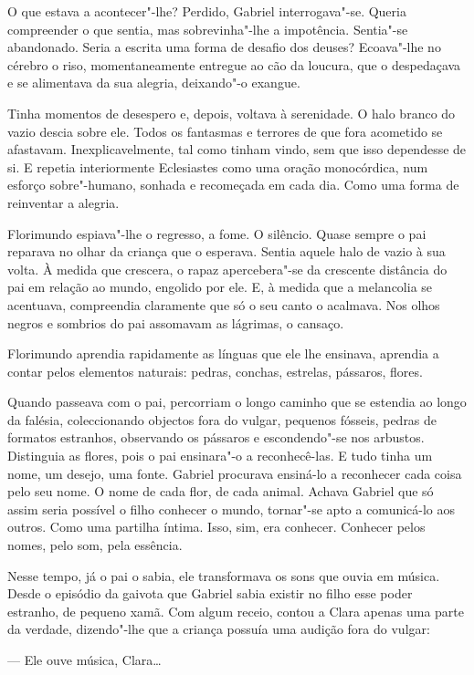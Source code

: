 O que estava a acontecer"-lhe? Perdido, Gabriel interrogava"-se. Queria
compreender o que sentia, mas sobrevinha"-lhe a impotência. Sentia"-se
abandonado. Seria a escrita uma forma de desafio dos deuses? Ecoava"-lhe
no cérebro o riso, momentaneamente entregue ao cão da loucura, que o
despedaçava e se alimentava da sua alegria, deixando"-o exangue.

Tinha momentos de desespero e, depois, voltava à serenidade. O halo
branco do vazio descia sobre ele. Todos os fantasmas e terrores de que
fora acometido se afastavam. Inexplicavelmente, tal como tinham vindo,
sem que isso dependesse de si. E repetia interiormente Eclesiastes como
uma oração monocórdica, num esforço sobre"-humano, sonhada e recomeçada
em cada dia. Como uma forma de reinventar a alegria.

Florimundo espiava"-lhe o regresso, a fome. O silêncio. Quase sempre o
pai reparava no olhar da criança que o esperava. Sentia aquele halo de
vazio à sua volta. À medida que crescera, o rapaz apercebera"-se da
crescente distância do pai em relação ao mundo, engolido por ele. E, à
medida que a melancolia se acentuava, compreendia claramente que só o
seu canto o acalmava. Nos olhos negros e sombrios do pai assomavam as
lágrimas, o cansaço.

Florimundo aprendia rapidamente as línguas que ele lhe ensinava,
aprendia a contar pelos elementos naturais: pedras, conchas, estrelas,
pássaros, flores.

Quando passeava com o pai, percorriam o longo caminho que se estendia ao
longo da falésia, coleccionando objectos fora do vulgar, pequenos
fósseis, pedras de formatos estranhos, observando os pássaros e
escondendo"-se nos arbustos. Distinguia as flores, pois o pai ensinara"-o
a reconhecê-las. E tudo tinha um nome, um desejo, uma fonte. Gabriel
procurava ensiná-lo a reconhecer cada coisa pelo seu nome. O nome de
cada flor, de cada animal. Achava Gabriel que só assim seria possível o
filho conhecer o mundo, tornar"-se apto a comunicá-lo aos outros. Como
uma partilha íntima. Isso, sim, era conhecer. Conhecer pelos nomes, pelo
som, pela essência.

Nesse tempo, já o pai o sabia, ele transformava os sons que ouvia em
música. Desde o episódio da gaivota que Gabriel sabia existir no filho
esse poder estranho, de pequeno xamã. Com algum receio, contou a Clara
apenas uma parte da verdade, dizendo"-lhe que a criança possuía uma
audição fora do vulgar:

--- Ele ouve música, Clara\ldots{}

